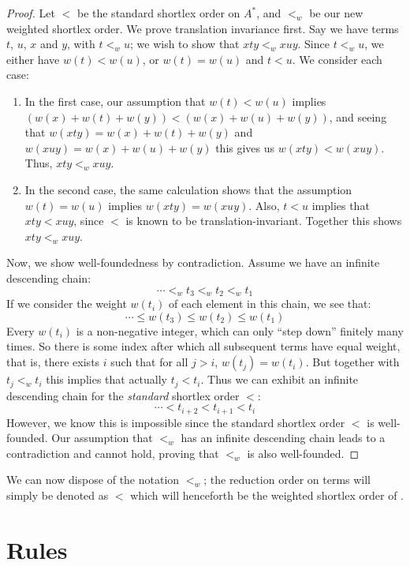 \documentclass[../generics]{subfiles}
\begin{document}
\begin{proof}
Let $<$ be the standard shortlex order on $A^*$, and $<_w$ be our new weighted shortlex order. We prove translation invariance first. Say we have terms $t$, $u$, $x$ and $y$, with $t<_w u$; we wish to show that $xty<_w xuy$. Since $t<_w u$, we either have $w(t)<w(u)$, or $w(t)=w(u)$ and $t<u$. We consider each case:
\begin{enumerate}
\item In the first case, our assumption that $w(t)<w(u)$ implies $(w(x)+w(t)+w(y))<(w(x)+w(u)+w(y))$, and seeing that $w(xty)=w(x)+w(t)+w(y)$ and $w(xuy)=w(x)+w(u)+w(y)$ this gives us $w(xty)<w(xuy)$. Thus, $xty<_w xuy$.
\item In the second case, the same calculation shows that the assumption $w(t)=w(u)$ implies $w(xty)=w(xuy)$. Also, $t<u$ implies that $xty<xuy$, since $<$ is known to be translation-invariant. Together this shows $xty<_w xuy$.
\end{enumerate}
Now, we show well-foundedness by contradiction. Assume we have an infinite descending chain:
\[\cdots<_w  t_3<_w t_2<_w t_1\]
If we consider the weight $w(t_i)$ of each element in this chain, we see that:
\[\cdots\le w(t_3)\le w(t_2)\le w(t_1)\]
Every $w(t_i)$ is a non-negative integer, which can only ``step down'' finitely many times. So there is some index after which all subsequent terms have equal weight, that is, there exists $i$ such that for all $j>i$, $w(t_j)=w(t_i)$. But together with $t_j<_w t_i$ this implies that actually $t_j < t_i$. Thus we can exhibit an infinite descending chain for the \emph{standard} shortlex order $<$:
\[\cdots<t_{i+2}<t_{i+1}<t_i\]
However, we know this is impossible since the standard shortlex order $<$ is well-founded. Our assumption that $<_w$ has an infinite descending chain leads to a contradiction and cannot hold, proving that $<_w$ is also well-founded.
\end{proof}
We can now dispose of the notation $<_w$; the reduction order on terms will simply be denoted as $<$ which will henceforth be the weighted shortlex order of .

\section{Rules}\label{building rules}
\end{document}
